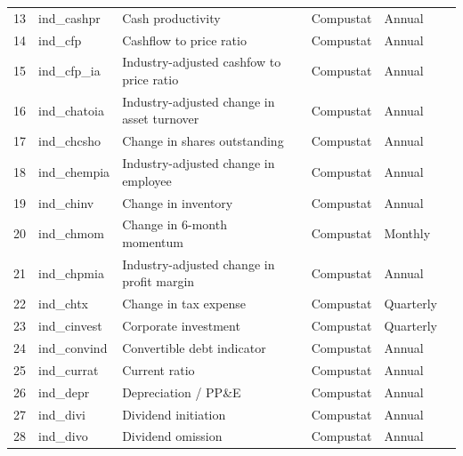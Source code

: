 \documentclass[11pt, a4paper, table]{article}
\begin{document}
\begin{landscape}
\begin{center}
\begin{longtable}{lllllll}
			13 & ind\_cashpr & Cash productivity & 
				\cite{chandrashekar_productivity_2009} & Compustat & Annual \\
			14 & ind\_cfp\footnotemark[\value{footnote}] & Cashflow to price ratio & 
				\cite{desai_value-glamour_2004} & Compustat & Annual \\
			15 & ind\_cfp\_ia\footnotemark[\value{footnote}] & Industry-adjusted cashfow to price ratio & 
				\cite{asness_predicting_2000} & Compustat & Annual \\
			16 & ind\_chatoia\footnotemark[\value{footnote}] & Industry-adjusted change in asset turnover & 
				\cite{soliman_use_2008} & Compustat & Annual \\
			17 & ind\_chcsho & Change in shares outstanding & 
				\cite{pontiff_share_2008} & Compustat & Annual \\
			18 & ind\_chempia & Industry-adjusted change in employee & 
				\cite{asness_predicting_2000} & Compustat & Annual \\
			19 & ind\_chinv\footnotemark[\value{footnote}] & Change in inventory & 
				\cite{thomas_inventory_2002} & Compustat & Annual \\
			20 & ind\_chmom & Change in 6-month momentum & 
				\cite{gettleman_acceleration_2006} & Compustat & Monthly \\
			21 & ind\_chpmia\footnotemark[\value{footnote}] & Industry-adjusted change in profit margin & 
				\cite{soliman_use_2008} & Compustat & Annual \\
			22 & ind\_chtx & Change in tax expense & 
				\cite{thomas_tax_2011} & Compustat & Quarterly \\
			23 & ind\_cinvest & Corporate investment & 
				\cite{titman_capital_2004} & Compustat & Quarterly \\
			24 & ind\_convind & Convertible debt indicator & 
				\cite{valta_strategic_2016} & Compustat & Annual \\
			25 & ind\_currat & Current ratio & 
				\cite{ou_financial_1989} & Compustat & Annual \\
			26 & ind\_depr & Depreciation / PP\&E & 
				\cite{holthausen_prediction_1992} & Compustat & Annual \\
			27 & ind\_divi & Dividend initiation & 
				\cite{michaely_price_1995} & Compustat & Annual \\
			28 & ind\_divo & Dividend omission & 
				\cite{michaely_price_1995} & Compustat & Annual \\

\end{longtable}
\end{center}
\end{landscape}
\end{document}
